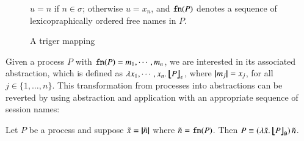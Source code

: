\begin{definition}
\begin{figure}[t]
$u = n$ if $n\in \sigma$; otherwise $u = x_n$, and  
$\mathtt{fn}(P)$ denotes a sequence of lexicopraphically ordered 
free names in $P$. 
\caption{\label{f:auxmap} A triger mapping}
\end{figure}
\end{definition}

Given a process $P$ with $\mathtt{fn}(P) = m_1, \cdots, m_n$, we are interested in its associated abstraction, which is defined as
$\lambda x_1, \cdots, x_n.\,\big\lfloor\!\!\big\lfloor P\big\rfloor\!\!\big\rfloor^{}_\epsilon$, where $|\!|m_j|\!| = x_j$, for all $j \in \{1, \ldots, n\}$.
This transformation from processes into abstractions can be reverted by
using abstraction and application with an appropriate sequence of session names:
%
\begin{proposition}\rm
	Let $P$ be a \HOp process and 
	suppose $\tilde{x} = |\!|\tilde{n}|\!|$ where 
$\tilde{n} = \mathtt{fn}(P)$.
	Then $P \equiv (\lambda \tilde{x}.\,\big\lfloor\!\!\big\lfloor P\big\rfloor\!\!\big\rfloor^{}_\emptyset)\, {\tilde{n}}$.
\end{proposition}

